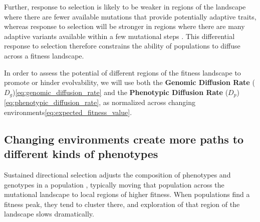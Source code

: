 \documentclass[PhD]{msu-thesis}
\begin{document}
%
%
Further, response to selection is likely to be weaker in regions of the landscape where there are fewer available mutations that provide potentially adaptive traits, whereas response to selection will be stronger in regions where there are many adaptive variants available within a few mutational steps \cite{alberch_genes_1991,carter_role_2005}. This differential response to selection therefore constrains the ability of populations to diffuse across a fitness landscape.

In order to assess the potential of different regions of the fitness landscape to promote or hinder evolvability, we will use both the \textbf{Genomic Diffusion Rate} ($D_g$)\ref{eq:genomic_diffusion_rate} and the \textbf{Phenotypic Diffusion Rate} ($D_p$)\ref{eq:phenotypic_diffusion_rate}, as normalized across changing environments\ref{eq:expected_fitness_value}.

\subsection{Changing environments create more paths to different kinds of phenotypes}
Sustained directional selection adjusts the composition of phenotypes and genotypes in a population \cite{wright_evolution_1931}, typically moving that population across the mutational landscape to local regions of higher fitness. When populations find a fitness peak, they tend to cluster there, and exploration of that region of the landscape slows dramatically.
\end{document}
